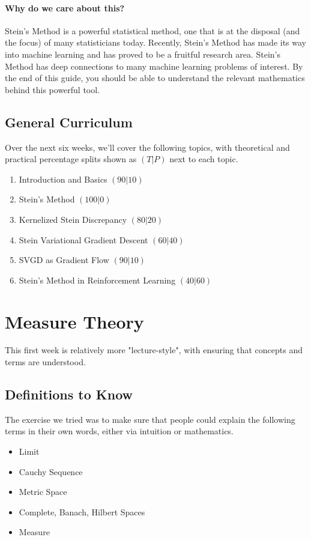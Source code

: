 \documentclass[12pt]{article}
\begin{document}
\paragraph{Why do we care about this?} Stein's Method is a powerful statistical method, one that is at the disposal (and the focus) of many statisticians today. Recently, Stein's Method has made its way into machine learning and has proved to be a fruitful research area. Stein's Method has deep connections to many machine learning problems of interest. By the end of this guide, you should be able to understand the relevant mathematics behind this powerful tool.   
\subsection{General Curriculum}

Over the next six weeks, we'll cover the following topics, with theoretical and practical percentage splits shown as $(T | P)$ next to each topic.

\begin{enumerate}
    \item Introduction and Basics $(90 | 10)$
    \item Stein's Method $(100 | 0)$
    \item Kernelized Stein Discrepancy $(80 | 20)$
    \item Stein Variational Gradient Descent $(60 | 40)$
    \item SVGD as Gradient Flow $(90 | 10)$
    \item Stein's Method in Reinforcement Learning $(40 | 60)$
\end{enumerate}

\section{Measure Theory}

This first week is relatively more "lecture-style", with ensuring that concepts and terms are understood. 

\subsection{Definitions to Know}

The exercise we tried was to make sure that people could explain the following terms in their own words, either via intuition or mathematics.

\begin{itemize}
    \item Limit
    \item Cauchy Sequence
    \item Metric Space
    \item Complete, Banach, Hilbert Spaces
    \item Measure
\end{itemize}
\end{document}
